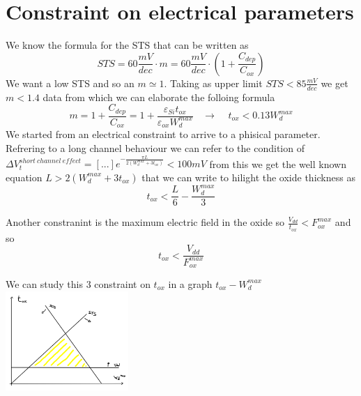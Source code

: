 \section{Constraint on electrical parameters}

We know the formula for the STS that can be written as
\begin{equation}
STS=60 \frac{mV}{dec} \cdot m =60 \frac{mV}{dec} \cdot (1+\frac{C_{dep}}{C_{ox}})
\end{equation}
We want a low STS and so an $m\simeq 1$. Taking as upper limit $STS<85 \frac{mV}{dec}$ we get $m<1.4$ data from which we can elaborate the folloing formula 
\begin{equation}
m=1+\frac{C_{dep}}{C_{ox}}=1+\frac{\varepsilon_{Si}t_{ox}}{\varepsilon_{ox}W_d^{max}}\ \ \ \ \rightarrow \ \ \ \ \ t_{ox}<0.13W_d^{max}
\end{equation} 
We started from an electrical constraint to arrive to a phisical parameter.\\
\vspace{5mm}
Refrering to a long channel behaviour we can refer to the condition of $\Delta V_t^{short \ channel \ effect}=[...]e^{-\frac{\pi L}{2(W_{d}^{max}+3t_{ox})}}<100mV$ from this we get the well known equation $L>2(W_d^{max}+3t_{ox})$ that we can write to hilight the oxide thickness as 
\begin{equation}
t_{ox}<\frac{L}{6}-\frac{W_{d}^{max}}{3}
\end{equation}
\vspace{5mm}

Another constranint is the maximum electric field in the oxide so $\frac{V_{dd}}{t_{ox}}<F_{ox}^{max}$ and so 
\begin{equation}
t_{ox}<\frac{V_{dd}}{F_{ox}^{max}}
\end{equation}
\vspace{5mm}

We can study this 3 constraint on $t_{ox}$ in a graph $t_{ox}-W_d^{max}$\\

\centering
\includegraphics[width=0.35\textwidth]{trianglemos.png}\\
\raggedright


